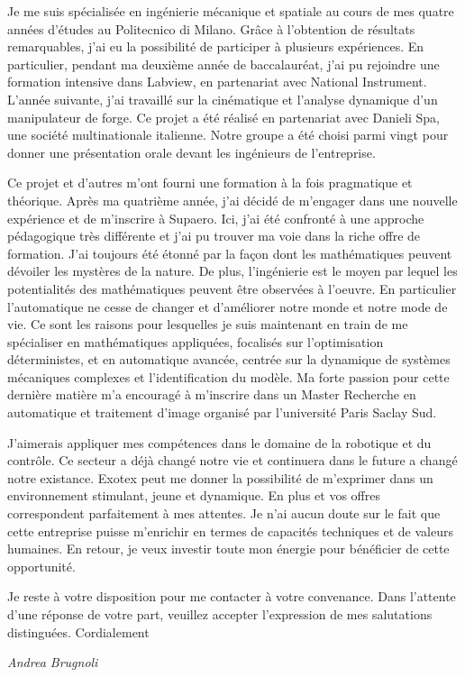\documentclass[11pt]{letter}
\begin{document}
Je me suis spécialisée en ingénierie mécanique et spatiale au cours de mes quatre années d'études au Politecnico di Milano. Grâce à l'obtention de résultats remarquables, j'ai eu la possibilité de participer à plusieurs expériences. En particulier, pendant ma deuxième année de baccalauréat, j'ai pu rejoindre une formation intensive dans Labview, en partenariat avec National Instrument. L'année suivante, j'ai travaillé sur la cinématique et l'analyse dynamique d'un manipulateur de forge. Ce projet a été réalisé en partenariat avec Danieli Spa, une société multinationale italienne. Notre groupe a été choisi parmi vingt pour donner une présentation orale devant les ingénieurs de l'entreprise.
\begin{comment}
J'ai spécialement apprécié de travailler sur un projet de transfert interplanétaire. Dans des missions spatiales complexes différentes disciplines doivent être intégrées et c'est la raison pour la quelle j'ai travaillé passionnément au projet. Plus tard, j'ai eu l'occasion de travailler sur la dynamique multi-corps dans l'environnement Simulink pour étudier les flexibilités des appendices au cours de manoeuvres de satellites.
\end{comment}
 Ce projet et d'autres m'ont fourni une formation à la fois pragmatique et théorique. Après ma quatrième année, j'ai décidé de m'engager dans une nouvelle expérience et de m'inscrire à Supaero. Ici, j'ai été confronté à une approche pédagogique très différente et j'ai pu trouver ma voie dans la riche offre de formation. J'ai toujours été étonné par la façon dont les mathématiques peuvent dévoiler les mystères de la nature. De plus, l'ingénierie est le moyen par lequel les potentialités des mathématiques peuvent être observées à l'oeuvre. En particulier l'automatique ne cesse de changer et d'améliorer notre monde et notre mode de vie. Ce sont les raisons pour lesquelles je suis maintenant en train de me spécialiser en mathématiques appliquées, focalisés sur l'optimisation déterministes,  et en automatique avancée, centrée sur la dynamique de systèmes mécaniques complexes et l'identification du modèle. Ma forte passion pour cette dernière matière m'a encouragé à m'inscrire dans un Master Recherche en automatique et traitement d'image organisé par l'université Paris Saclay Sud. 

J'aimerais appliquer mes compétences dans le domaine de la robotique et du contrôle. Ce secteur a déjà changé notre vie et continuera dans le future a changé notre existance. Exotex peut me donner la possibilité de m'exprimer dans un environnement stimulant, jeune et dynamique. En plus et vos offres correspondent parfaitement à mes attentes. Je n'ai aucun doute sur le fait que cette entreprise puisse m'enrichir en termes de capacités techniques et de valeurs humaines. En retour, je veux investir toute mon énergie pour bénéficier de cette opportunité.

Je reste à votre disposition pour me contacter à votre convenance. Dans l'attente d'une réponse de votre part, veuillez accepter l'expression de mes salutations distinguées. Cordialement


 \begin{center}
 \large\textit{Andrea Brugnoli}
 \end{center}
 
\end{document}
